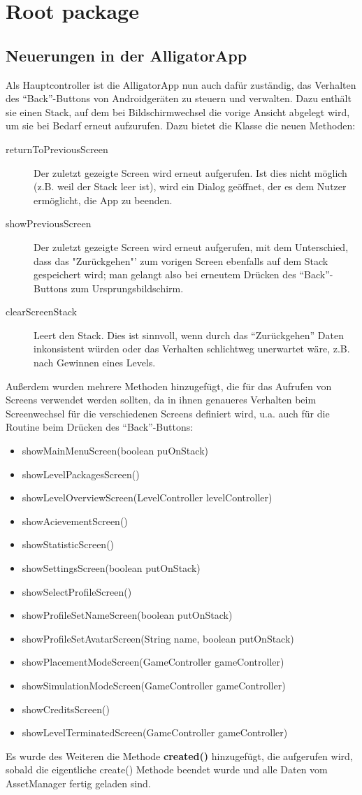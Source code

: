\section{Root package}

\subsection{Neuerungen in der AlligatorApp}

Als Hauptcontroller ist die AlligatorApp nun auch dafür zuständig, das Verhalten des "`Back"'-Buttons von Androidgeräten zu steuern und verwalten. Dazu enthält sie einen Stack, auf dem bei Bildschirmwechsel die vorige Ansicht abgelegt wird, um sie bei Bedarf erneut aufzurufen. Dazu bietet die Klasse die neuen Methoden:
\begin{description}
	\item[returnToPreviousScreen] Der zuletzt gezeigte Screen wird erneut aufgerufen. Ist dies nicht möglich (z.B. weil der Stack leer ist), wird ein Dialog geöffnet, der es dem Nutzer ermöglicht, die App zu beenden.
	\item[showPreviousScreen] Der zuletzt gezeigte Screen wird erneut aufgerufen, mit dem Unterschied, dass das "Zurückgehen"' zum vorigen Screen ebenfalls auf dem Stack gespeichert wird; man gelangt also bei erneutem Drücken des "`Back"'-Buttons zum Ursprungsbildschirm.
	\item[clearScreenStack] Leert den Stack. Dies ist sinnvoll, wenn durch das "`Zurückgehen"' Daten inkonsistent würden oder das Verhalten schlichtweg unerwartet wäre, z.B. nach Gewinnen eines Levels.
\end{description}

Außerdem wurden mehrere Methoden hinzugefügt, die für das Aufrufen von Screens verwendet werden sollten, da in ihnen genaueres Verhalten beim Screenwechsel für die verschiedenen Screens definiert wird, u.a. auch für die Routine beim Drücken des "`Back"'-Buttons:
\begin{itemize}
	\item showMainMenuScreen(boolean puOnStack)
	\item showLevelPackagesScreen()
	\item showLevelOverviewScreen(LevelController levelController)
	\item showAcievementScreen()
	\item showStatisticScreen()
	\item showSettingsScreen(boolean putOnStack)
	\item showSelectProfileScreen()
	\item showProfileSetNameScreen(boolean putOnStack)
	\item showProfileSetAvatarScreen(String name, boolean putOnStack)
	\item showPlacementModeScreen(GameController gameController)
	\item showSimulationModeScreen(GameController gameController)
	\item showCreditsScreen()
	\item showLevelTerminatedScreen(GameController gameController)
\end{itemize}

Es wurde des Weiteren die Methode \textbf{created()} hinzugefügt, die aufgerufen wird, sobald die eigentliche create() Methode beendet wurde und alle Daten vom AssetManager fertig geladen sind.
 
